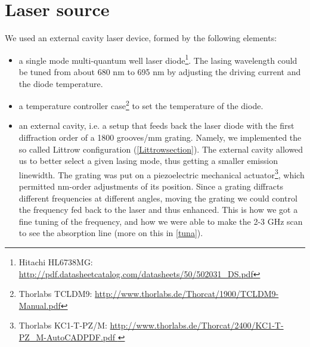  \section{Laser source}\label{lasersource}
We used an external cavity laser device, formed by the following elements:
\begin{itemize}
\item a single mode multi-quantum well 
 laser diode\footnote{Hitachi HL6738MG: \url{http://pdf.datasheetcatalog.com/datasheets/50/502031_DS.pdf}}.
 The lasing wavelength could be tuned from about 680 nm to 695 nm by adjusting the driving current and the diode temperature.
\item a temperature controller case\footnote{Thorlabs TCLDM9: \url{http://www.thorlabs.de/Thorcat/1900/TCLDM9-Manual.pdf}} to set the temperature of the diode. 
\item an external cavity, i.e. a setup that feeds back the laser diode with the first diffraction order of a 1800 grooves/mm grating. Namely, we implemented the so called Littrow configuration (\cref{Littrowsection}). The external cavity allowed us to better select a given lasing mode, thus getting a smaller emission linewidth. The grating was put on a piezoelectric mechanical actuator\footnote{Thorlabs KC1-T-PZ/M: \url{http://www.thorlabs.de/Thorcat/2400/KC1-T-PZ_M-AutoCADPDF.pdf }}, which permitted nm-order adjustments of its position. Since a grating diffracts different frequencies at different angles, moving the grating we could control the frequency fed back to the laser and thus enhanced. This is how we got a fine tuning of the frequency, and how we were able to make the 2-3 GHz scan to see the absorption line (more on this in \cref{tuna}).
\end{itemize} 
